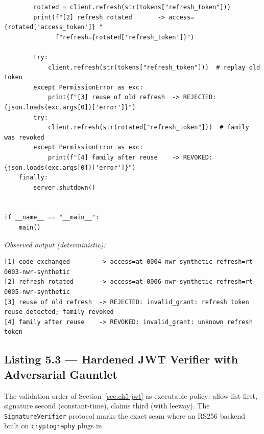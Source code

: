 \begin{verbatim}
        rotated = client.refresh(str(tokens["refresh_token"]))
        print(f"[2] refresh rotated       -> access={rotated['access_token']} "
              f"refresh={rotated['refresh_token']}")

        try:
            client.refresh(str(tokens["refresh_token"]))  # replay old token
        except PermissionError as exc:
            print(f"[3] reuse of old refresh  -> REJECTED: {json.loads(exc.args[0])['error']}")
        try:
            client.refresh(str(rotated["refresh_token"]))  # family was revoked
        except PermissionError as exc:
            print(f"[4] family after reuse    -> REVOKED: {json.loads(exc.args[0])['error']}")
    finally:
        server.shutdown()


if __name__ == "__main__":
    main()
\end{verbatim}
\noindent\emph{Observed output (deterministic):}
\begin{verbatim}
[1] code exchanged        -> access=at-0004-nwr-synthetic refresh=rt-0003-nwr-synthetic
[2] refresh rotated       -> access=at-0006-nwr-synthetic refresh=rt-0005-nwr-synthetic
[3] reuse of old refresh  -> REJECTED: invalid_grant: refresh token reuse detected; family revoked
[4] family after reuse    -> REVOKED: invalid_grant: unknown refresh token
\end{verbatim}

\subsection{Listing 5.3 --- Hardened JWT Verifier with Adversarial Gauntlet}
\label{lst:jwt}

The validation order of Section~\ref{sec:ch5-jwt} as executable policy:
allow-list first, signature second (constant-time), claims third (with
leeway). The \texttt{SignatureVerifier} protocol marks the exact seam where
an RS256 backend built on \texttt{cryptography} plugs in.

